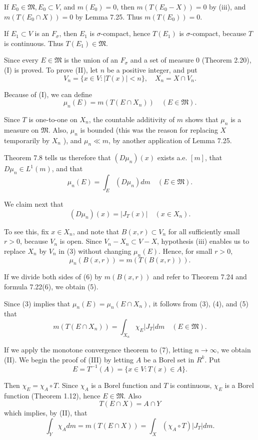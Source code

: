 If $E_0 \in \mathfrak{M}, E_0 \subset V$, and $m\left(E_0\right)=0$, then $m\left(T\left(E_0-X\right)\right)=0$ by (iii), and $m\left(T\left(E_0 \cap X\right)\right)=0$ by Lemma 7.25. Thus $m\left(T\left(E_0\right)\right)=0$.

If $E_1 \subset V$ is an $F_\sigma$, then $E_1$ is $\sigma$-compact, hence $T\left(E_1\right)$ is $\sigma$-compact, because $T$ is continuous. Thus $T\left(E_1\right) \in \mathfrak{M}$.

Since every $E \in \mathfrak{M}$ is the union of an $F_\sigma$ and a set of measure 0 (Theorem 2.20), (I) is proved.
To prove (II), let $n$ be a positive integer, and put
$$
V_n=\{x \in V:|T(x)|<n\}, \quad X_n=X \cap V_n .
$$

Because of (I), we can define
$$
\mu_n(E)=m\left(T\left(E \cap X_n\right)\right) \quad(E \in \mathfrak{M}) .
$$

Since $T$ is one-to-one on $X_n$, the countable additivity of $m$ shows that $\mu_n$ is a measure on $\mathfrak{M}$. Also, $\mu_n$ is bounded (this was the reason for replacing $X$ temporarily by $X_n$ ), and $\mu_n \ll m$, by another application of Lemma 7.25.

Theorem 7.8 tells us therefore that $\left(D \mu_n\right)(x)$ exists a.e. $[m]$, that $D \mu_n \in L^1(m)$, and that
$$
\mu_n(E)=\int_E\left(D \mu_n\right) d m \quad(E \in \mathfrak{M}) .
$$

We claim next that
$$
\left(D \mu_n\right)(x)=\left|J_T(x)\right| \quad\left(x \in X_n\right) .
$$

To see this, fix $x \in X_n$, and note that $B(x, r) \subset V_n$ for all sufficiently small $r>0$, because $V_n$ is open. Since $V_n-X_n \subset V-X$, hypothesis (iii) enables us to replace $X_n$ by $V_n$ in (3) without changing $\mu_n(E)$. Hence, for small $r>0$,
$$
\mu_n(B(x, r))=m(T(B(x, r))) .
$$

If we divide both sides of (6) by $m(B(x, r))$ and refer to Theorem 7.24 and formula 7.22(6), we obtain (5).

Since (3) implies that $\mu_n(E)=\mu_n\left(E \cap X_n\right)$, it follows from (3), (4), and (5) that
$$
m\left(T\left(E \cap X_n\right)\right)=\int_{X_n} \chi_E\left|J_T\right| d m \quad(E \in \mathfrak{M}) .
$$

If we apply the monotone convergence theorem to (7), letting $n \rightarrow \infty$, we obtain (II).
We begin the proof of (III) by letting $A$ be a Borel set in $R^k$. Put
$$
E=T^{-1}(A)=\{x \in V: T(x) \in A\} .
$$

Then $\chi_E=\chi_A \circ T$. Since $\chi_A$ is a Borel function and $T$ is continuous, $\chi_E$ is a Borel function (Theorem 1.12), hence $E \in \mathfrak{M}$. Also
$$
T(E \cap X)=A \cap Y
$$
which implies, by (II), that
$$
\int_Y \chi_A d m=m(T(E \cap X))=\int_X\left(\chi_A \circ T\right)\left|J_T\right| d m .
$$

